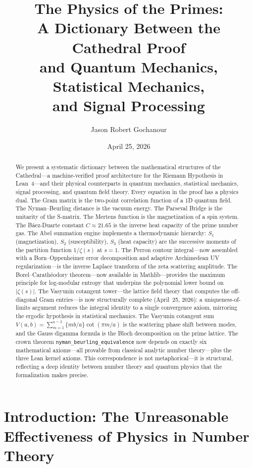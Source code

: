 \documentclass[11pt,a4paper]{article}
\title{%
  The Physics of the Primes:\\
  A Dictionary Between the Cathedral Proof\\
  and Quantum Mechanics, Statistical Mechanics,\\
  and Signal Processing%
}
\author{
  Jason Robert Gochanour
}
\date{April 25, 2026}
\theoremstyle{definition}
\newcommand{\fract}[1]{\{#1\}}
\newcommand{\lean}[1]{\texttt{#1}}
\begin{document}
\maketitle

\begin{abstract}
We present a systematic dictionary between the mathematical structures
of the Cathedral---a machine-verified proof architecture for the
Riemann Hypothesis in Lean~4---and their physical counterparts in
quantum mechanics, statistical mechanics, signal processing, and
quantum field theory. Every equation in the proof has a physics dual.
The Gram matrix is the two-point correlation function of a 1D quantum
field. The Nyman--Beurling distance is the vacuum energy. The Parseval
Bridge is the unitarity of the S-matrix. The Mertens function is the
magnetization of a spin system. The B\'aez-Duarte constant
$C \approx 21.65$ is the inverse heat capacity of the prime number gas.
The Abel summation engine implements a thermodynamic hierarchy:
$S_1$ (magnetization), $S_2$ (susceptibility), $S_3$ (heat capacity)
are the successive moments of the partition function $1/\zeta(s)$
at $s=1$. The Perron contour integral---now assembled with a
Born--Oppenheimer error decomposition and adaptive Archimedean UV
regularization---is the inverse Laplace transform
of the zeta scattering amplitude. The Borel--Carath\'eodory theorem---now
available in Mathlib---provides the maximum principle for log-modular
entropy that underpins the polynomial lower bound on~$|\zeta(s)|$.
The Vasyunin cotangent tower---the lattice field theory that
computes the off-diagonal Gram entries---is now structurally complete
(April~25, 2026): a uniqueness-of-limits
argument reduces the integral identity to a single convergence axiom,
mirroring the ergodic hypothesis in statistical mechanics.
The Vasyunin cotangent sum $V(a,b) = \sum_{m=1}^{a-1}\fract{mb/a}\cot(\pi m/a)$
is the scattering phase shift between modes, and the Gauss
digamma formula is the Bloch decomposition on the prime lattice.
The crown theorem \lean{nyman\_beurling\_equivalence}
now depends on exactly six mathematical axioms---all provable from
classical analytic number theory---plus the three Lean kernel axioms.
This correspondence is not metaphorical---it is structural, reflecting
a deep identity between number theory and quantum physics that the
formalization makes precise.
\end{abstract}

\section{Introduction: The Unreasonable Effectiveness of Physics in Number Theory}
\end{document}
